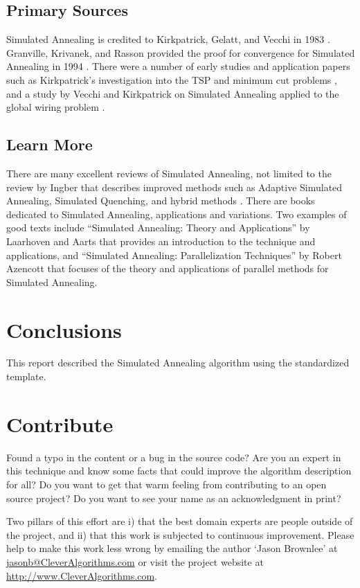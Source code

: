 \documentclass[a4paper, 11pt]{article}
\makeatletter
\newcommand{\myreportauthor}{Jason Brownlee}
\newcommand{\myreportemail}{jasonb@CleverAlgorithms.com}
\newcommand{\myreportwebsite}{http://www.CleverAlgorithms.com}
\makeatother
\begin{document}
% 
% 
\subsection{Primary Sources}
Simulated Annealing is credited to Kirkpatrick, Gelatt, and Vecchi in 1983 \cite{Kirkpatrick1983}. Granville, Krivanek, and Rasson provided the proof for convergence for Simulated Annealing in 1994 \cite{Granville1994}.
There were a number of early studies and application papers such as Kirkpatrick's investigation into the TSP and minimum cut problems \cite{Kirkpatrick1983a}, and a study by Vecchi and Kirkpatrick on Simulated Annealing applied to the global wiring problem \cite{Vecchi1983}.

% 
% 
\subsection{Learn More}
There are many excellent reviews of Simulated Annealing, not limited to the review by Ingber that describes improved methods such as Adaptive Simulated Annealing, Simulated Quenching, and hybrid methods \cite{Ingber1993}.
There are books dedicated to Simulated Annealing, applications and variations. Two examples of good texts include ``Simulated Annealing: Theory and Applications'' by Laarhoven and Aarts \cite{Laarhoven1988} that provides an introduction to the technique and applications, and ``Simulated Annealing: Parallelization Techniques'' by Robert Azencott \cite{Azencott1992} that focuses of the theory and applications of parallel methods for Simulated Annealing.

% 
% 
\section{Conclusions}
\label{sec:conclusions}
This report described the Simulated Annealing algorithm using the standardized template.

% 
% 
\section{Contribute}
\label{sec:contribute}
Found a typo in the content or a bug in the source code? 
Are you an expert in this technique and know some facts that could improve the algorithm description for all?
Do you want to get that warm feeling from contributing to an open source project? 
Do you want to see your name as an acknowledgment in print?

Two pillars of this effort are i) that the best domain experts are people outside of the project, and ii) that this work is subjected to continuous improvement. 
Please help to make this work less wrong by emailing the author `\myreportauthor' at \url{\myreportemail} or visit the project website at \url{\myreportwebsite}.



\end{document}
